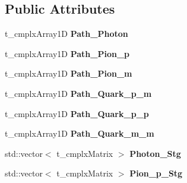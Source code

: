 \subsection*{Public Attributes}
\begin{DoxyCompactItemize}
\item 
\hypertarget{class_c___dedic_mem__1___loop_diagram_aa5a853322b4ffd20913a4af7502e5302}{t\-\_\-cmplx\-Array1\-D {\bfseries Path\-\_\-\-Photon}}\label{class_c___dedic_mem__1___loop_diagram_aa5a853322b4ffd20913a4af7502e5302}

\item 
\hypertarget{class_c___dedic_mem__1___loop_diagram_a6b07cd4c1167b5050948345e07227617}{t\-\_\-cmplx\-Array1\-D {\bfseries Path\-\_\-\-Pion\-\_\-p}}\label{class_c___dedic_mem__1___loop_diagram_a6b07cd4c1167b5050948345e07227617}

\item 
\hypertarget{class_c___dedic_mem__1___loop_diagram_a70a2afb41c880824f3394c1c0f6cb74e}{t\-\_\-cmplx\-Array1\-D {\bfseries Path\-\_\-\-Pion\-\_\-m}}\label{class_c___dedic_mem__1___loop_diagram_a70a2afb41c880824f3394c1c0f6cb74e}

\item 
\hypertarget{class_c___dedic_mem__1___loop_diagram_a9c0eae577f2e9c49ec993dc25fb32ece}{t\-\_\-cmplx\-Array1\-D {\bfseries Path\-\_\-\-Quark\-\_\-p\-\_\-m}}\label{class_c___dedic_mem__1___loop_diagram_a9c0eae577f2e9c49ec993dc25fb32ece}

\item 
\hypertarget{class_c___dedic_mem__1___loop_diagram_a35812e8d7d7239bd97cb272433bd5fda}{t\-\_\-cmplx\-Array1\-D {\bfseries Path\-\_\-\-Quark\-\_\-p\-\_\-p}}\label{class_c___dedic_mem__1___loop_diagram_a35812e8d7d7239bd97cb272433bd5fda}

\item 
\hypertarget{class_c___dedic_mem__1___loop_diagram_a0cd6a1173d2d0986459bd5096fa65cd3}{t\-\_\-cmplx\-Array1\-D {\bfseries Path\-\_\-\-Quark\-\_\-m\-\_\-m}}\label{class_c___dedic_mem__1___loop_diagram_a0cd6a1173d2d0986459bd5096fa65cd3}

\item 
\hypertarget{class_c___dedic_mem__1___loop_diagram_a1eec2f84c2f780759ed6f767a5eb9533}{std\-::vector$<$ t\-\_\-cmplx\-Matrix $>$ {\bfseries Photon\-\_\-\-Stg}}\label{class_c___dedic_mem__1___loop_diagram_a1eec2f84c2f780759ed6f767a5eb9533}

\item 
\hypertarget{class_c___dedic_mem__1___loop_diagram_a5d6ffdff7cc4dc1d129545ba4ab69280}{std\-::vector$<$ t\-\_\-cmplx\-Matrix $>$ {\bfseries Pion\-\_\-p\-\_\-\-Stg}}\label{class_c___dedic_mem__1___loop_diagram_a5d6ffdff7cc4dc1d129545ba4ab69280}


\end{DoxyCompactItemize}

